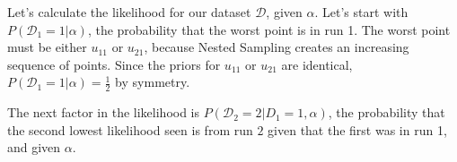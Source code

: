 \documentclass[a4paper, 11pt]{article}
\begin{document}
Let's calculate the likelihood for our dataset $\mathcal{D}$, given $\alpha$.
Let's start with $P(\mathcal{D}_1 = 1 | \alpha)$, the probability that the
worst point is in run 1. The worst point must be either
$u_{11}$ or $u_{21}$, because Nested Sampling creates an increasing sequence
of points. Since the priors for $u_{11}$ or $u_{21}$ are identical,
$P(\mathcal{D}_1 = 1 | \alpha) = \frac{1}{2}$ by symmetry.

The next factor in the likelihood is
$P(\mathcal{D}_2 = 2 | D_1 = 1, \alpha)$, the probability that the second
lowest likelihood seen is from run $2$ given that the first was in run 1, and
given $\alpha$.
\end{document}
